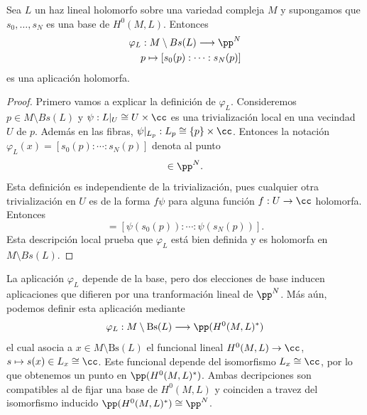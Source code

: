 	\begin{propo}
		Sea $L$ un haz lineal holomorfo sobre una variedad compleja $M$ y supongamos que $s_0,\dots,s_N$ es una base de $H^0(M,L)$. Entonces
		\begin{align*}
			\varphi_L:M\setminus Bs(L)\longrightarrow \pp^N\\
			p\mapsto [s_0(p):\cdots:s_N(p)]
		\end{align*}
		es una aplicación holomorfa.
	\end{propo}
	\begin{proof}
		Primero vamos a explicar la definición de $\varphi_L$. 
%		
		Consideremos $p\in M\setminus Bs(L)$ y $\psi:L|_U\cong U\times\cc$ es una trivialización local en una vecindad $U$ de $p$. Además en las fibras, $\psi|_{L_p}:L_p\cong \{p\}\times \cc$. Entonces la notación $\varphi_L(x)=[s_0(p):\cdots:s_N(p)]$ denota al punto
		\begin{equation*}
			[\psi(s_0(p)):\cdots:\psi(s_N(p))]\in\pp^N.
		\end{equation*}	
		Esta definición es independiente de la trivialización, pues cualquier otra trivialización en $U$ es de la forma $f\psi$ para alguna función $f:U\to\cc$ holomorfa. Entonces
		\begin{equation*}
			[f(p)\psi(s_0(p)):\cdots:f(p)\psi(s_N(p))]=[\psi(s_0(p)):\cdots:\psi(s_N(p))].
		\end{equation*}
		Esta descripción local prueba que $\varphi_L$ está bien definida y es holomorfa en $M\setminus Bs(L)$.
	\end{proof}
    
    \begin{remark}
    	La aplicación $\varphi_L$ depende de la base, pero dos elecciones de base inducen aplicaciones que difieren por una tranformación lineal de $\pp^N$. Más aún, podemos definir esta aplicación mediante
    	\begin{align*}
    		\varphi_L:M\setminus \mathrm{Bs}(L)\longrightarrow\pp(H^0(M,L)^*)
    	\end{align*} 
    	el cual asocia a $x\in M\setminus \mathrm{Bs}(L)$ el funcional lineal $H^0(M,L)\to \cc$, $s\mapsto s(x)\in L_x\cong\cc$. Este funcional depende del isomorfismo $L_x\cong\cc$, por lo que obtenemos un punto en $\pp(H^0(M,L)^*)$. Ambas decripciones son compatibles al de fijar una base de $H^0(M,L)$ y coinciden a travez del isomorfismo inducido $\pp(H^0(M,L)^*)\cong\pp^N$.
    \end{remark}

